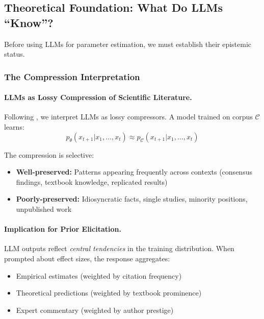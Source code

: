 \subsection{Theoretical Foundation: What Do LLMs ``Know''?}

Before using LLMs for parameter estimation, we must establish their epistemic status.

\subsubsection{The Compression Interpretation}

\paragraph{LLMs as Lossy Compression of Scientific Literature.}
Following \citet{deletang2024language}, we interpret LLMs as lossy compressors. A model trained on corpus $\mathcal{C}$ learns:
\begin{equation}
p_\theta(x_{t+1} | x_1, \ldots, x_t) \approx p_{\mathcal{C}}(x_{t+1} | x_1, \ldots, x_t)
\end{equation}

The compression is selective:
\begin{itemize}
    \item \textbf{Well-preserved:} Patterns appearing frequently across contexts (consensus findings, textbook knowledge, replicated results)
    \item \textbf{Poorly-preserved:} Idiosyncratic facts, single studies, minority positions, unpublished work
\end{itemize}

\paragraph{Implication for Prior Elicitation.}
LLM outputs reflect \textit{central tendencies} in the training distribution. When prompted about effect sizes, the response aggregates:
\begin{itemize}
    \item Empirical estimates (weighted by citation frequency)
    \item Theoretical predictions (weighted by textbook prominence)
    \item Expert commentary (weighted by author prestige)
\end{itemize}

